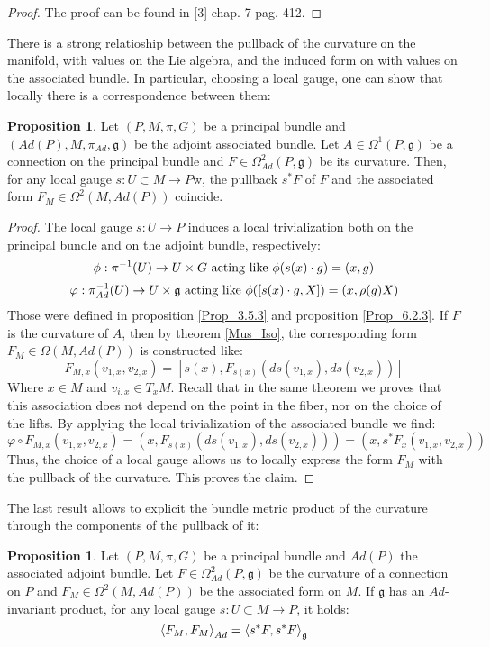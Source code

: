 \documentclass[12pt,a4paper]{report}
\theoremstyle{definition}
\theoremstyle{Theorem}
\newtheorem{Prop}[Def]{Proposition}
\theoremstyle{definition}
\theoremstyle{definition}
\begin{document}
	\begin{proof}
		The proof can be found in [3] chap. 7 pag. 412.
	\end{proof}
	There is a strong relatioship between the pullback of the curvature on the manifold, with values on the Lie algebra, and the induced form on with values on the associated bundle. In particular, choosing a local gauge, one can show that locally there is a correspondence between them:
	\begin{Prop}\label{God_Prop}
		Let $(P,M,\pi,G)$ be a principal bundle and $(Ad(P),M,\pi_{Ad},\mathfrak{g})$ be the adjoint associated bundle. Let $A\in \Omega^1(P,\mathfrak{g})$ be a connection on the principal bundle and $F\in\Omega^2_{Ad}(P,\mathfrak{g})$ be its curvature. Then, for any local gauge $s:U\subset M\rightarrow P$w, the pullback $s^*F$ of $F$ and the associated form $F_M\in\Omega^2(M,Ad(P))$ coincide.  
	\end{Prop}
	\begin{proof}
		The local gauge $s:U\rightarrow P$ induces a local trivialization both on the principal bundle and on the adjoint bundle, respectively:
		$$\phi: \pi^{-1}(U)\rightarrow U\times G\hbox{ acting like }\phi(s(x)\cdot g)=(x,g)$$
		$$\varphi: \pi_{Ad}^{-1}(U)\rightarrow U\times \mathfrak{g}\hbox{ acting like }\phi([s(x)\cdot g,X])=(x,\rho(g)X)$$
		Those were defined in proposition \ref{Prop_3.5.3} and proposition \ref{Prop_6.2.3}. If $F$ is the curvature of $A$, then by theorem \ref{Mus_Iso}, the corresponding form $F_M\in\Omega(M,Ad(P))$ is constructed like:
		$$F_{M,x}(v_{1,x},v_{2,x})=[s(x),F_{s(x)}(ds(v_{1,x}),ds(v_{2,x}))]$$
		Where $x\in M$ and $v_{i,x}\in T_xM$.
		Recall that in the same theorem we proves that this association does not depend on the point in the fiber, nor on the choice of the lifts.
		By applying the local trivialization of the associated bundle we find:
		$$\varphi\circ F_{M,x}(v_{1,x},v_{2,x})=(x,F_{s(x)}(ds(v_{1,x}),ds(v_{2,x})))=(x,s^*F_{x}(v_{1,x},v_{2,x}))$$
		Thus, the choice of a local gauge allows us to locally express the form $F_M$ with the pullback of the curvature. This proves the claim.
	\end{proof}
	The last result allows to explicit the bundle metric product of the curvature through the components of the pullback of it:
	\begin{Prop}
		Let $(P,M,\pi,G)$ be a principal bundle and $Ad(P)$ the associated adjoint bundle. Let $F\in\Omega^2_{Ad}(P,\mathfrak{g})$ be the curvature of a connection on $P$ and $F_M\in\Omega^2(M,Ad(P))$ be the associated form on $M$. If $\mathfrak{g}$ has an $Ad$-invariant product, for any local gauge $s:U\subset M\rightarrow P$, it holds:
		$$\braket{F_M,F_M}_{Ad}=\braket{s^*F,s^*F}_\mathfrak{g}$$
	\end{Prop}
\end{document}

